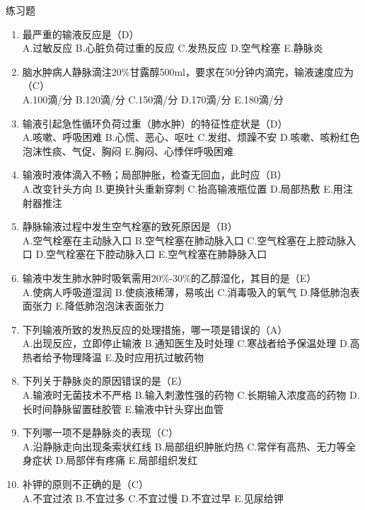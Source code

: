 \documentclass[11pt, a4paper]{ctexart}
\begin{document}
\begin{examplebox}{练习题}
\begin{enumerate}
    \item 最严重的输液反应是（D）\\
    A.过敏反应 \quad B.心脏负荷过重的反应 \quad C.发热反应 \quad D.空气栓塞 \quad E.静脉炎
    \item 脑水肿病人静脉滴注20\%甘露醇500ml，要求在50分钟内滴完，输液速度应为（C）\\
    A.100滴/分 \quad B.120滴/分 \quad C.150滴/分 \quad D.170滴/分 \quad E.180滴/分
    \item 输液引起急性循环负荷过重（肺水肿）的特征性症状是（D）\\
    A.咳嗽、呼吸困难 \quad B.心慌、恶心、呕吐 \quad C.发绀、烦躁不安 \quad D.咳嗽、咳粉红色泡沫性痰、气促、胸闷 \quad E.胸闷、心悸伴呼吸困难
    \item 输液时液体滴入不畅；局部肿胀，检查无回血，此时应（B）\\
    A.改变针头方向 \quad B.更换针头重新穿刺 \quad C.抬高输液瓶位置 \quad D.局部热敷 \quad E.用注射器推注
    \item 静脉输液过程中发生空气栓塞的致死原因是（B）\\
    A.空气栓塞在主动脉入口 \quad B.空气栓塞在肺动脉入口 \quad C.空气栓塞在上腔动脉入口 \quad D.空气栓塞在下腔动脉入口 \quad E.空气栓塞在肺静脉入口
    \item 输液中发生肺水肿时吸氧需用20\%-30\%的乙醇湿化，其目的是（E）\\
    A.使病人呼吸道湿润 \quad B.使痰液稀薄，易咳出 \quad C.消毒吸入的氧气 \quad D.降低肺泡表面张力 \quad E.降低肺泡泡沫表面张力
    \item 下列输液所致的发热反应的处理措施，哪一项是错误的（A）\\
    A.出现反应，立即停止输液 \quad B.通知医生及时处理 \quad C.寒战者给予保温处理 \quad D.高热者给予物理降温 \quad E.及时应用抗过敏药物
    \item 下列关于静脉炎的原因错误的是（E）\\
    A.输液时无菌技术不严格 \quad B.输入刺激性强的药物 \quad C.长期输入浓度高的药物 \quad D.长时间静脉留置硅胶管 \quad E.输液中针头穿出血管
    \item 下列哪一项不是静脉炎的表现（C）\\
    A.沿静脉走向出现条索状红线 \quad B.局部组织肿胀灼热 \quad C.常伴有高热、无力等全身症状 \quad D.局部伴有疼痛 \quad E.局部组织发红
    \item 补钾的原则不正确的是（C）\\
    A.不宜过浓 \quad B.不宜过多 \quad C.不宜过慢 \quad D.不宜过早 \quad E.见尿给钾
\end{enumerate}
\end{examplebox}
\end{document}

